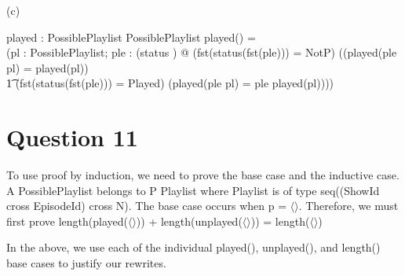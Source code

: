 \documentclass[a4paper,10pt,fleqn]{article}
\begin{document}
\medskip

\noindent\hspace*{\parindent}(c) \begin{axdef}
played : PossiblePlaylist \fun PossiblePlaylist
\where
played(\langle \rangle) = \langle \rangle \land \\
\quad (\forall pl : PossiblePlaylist; ple : (\dom status \cross \nat) @ (fst(status(fst(ple))) = NotP) \implies ((played(\langle ple \rangle \cat pl) = played(pl)) \land \\
\t1 (fst(status(fst(ple))) = Played) \implies (played(\langle ple \rangle \cat pl) = \langle ple \rangle \cat played(pl))))
\end{axdef}

\section*{Question 11}

\noindent To use proof by induction, we need to prove the base case and the inductive case.  A PossiblePlaylist belongs to P Playlist where Playlist is of type seq((ShowId cross EpisodeId) cross N). The base case occurs when p = $\langle \rangle$. Therefore, we must first prove length(played($\langle \rangle$)) + length(unplayed($\langle \rangle$)) = length($\langle \rangle$)

\bigskip

\begin{center}
\end{center}
\bigskip

\noindent In the above, we use each of the individual played(), unplayed(), and length() base cases to justify our rewrites.

\bigskip
\end{document}
